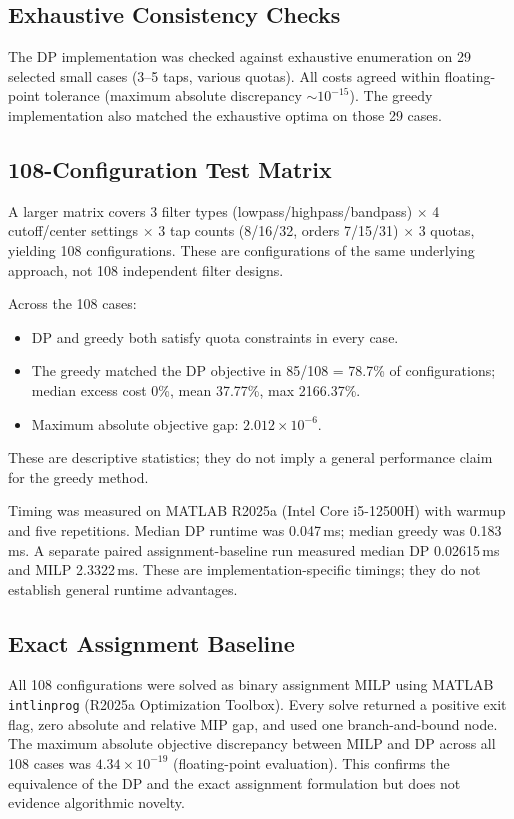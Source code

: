 
\subsection{Exhaustive Consistency Checks}

The DP implementation was checked against exhaustive enumeration on 29
selected small cases (3--5 taps, various quotas). All costs agreed
within floating-point tolerance (maximum absolute discrepancy
$\sim 10^{-15}$). The greedy implementation also matched the
exhaustive optima on those 29 cases.

\subsection{108-Configuration Test Matrix}

A larger matrix covers 3 filter types (lowpass/highpass/bandpass)
$\times$ 4 cutoff/center settings $\times$ 3 tap counts (8/16/32, orders
7/15/31) $\times$ 3 quotas, yielding 108 configurations. These are
configurations of the same underlying approach, not 108 independent
filter designs.

Across the 108 cases:
\begin{itemize}
\item DP and greedy both satisfy quota constraints in every case.
\item The greedy matched the DP objective in 85/108 = 78.7\% of
configurations; median excess cost 0\%, mean 37.77\%, max 2166.37\%.
\item Maximum absolute objective gap: $2.012 \times 10^{-6}$.
\end{itemize}
These are descriptive statistics; they do not imply a general
performance claim for the greedy method.

Timing was measured on MATLAB R2025a (Intel Core i5-12500H) with warmup
and five repetitions. Median DP runtime was 0.047\,ms; median greedy was
0.183\,ms. A separate paired assignment-baseline run measured median DP
0.02615\,ms and MILP 2.3322\,ms. These are implementation-specific
timings; they do not establish general runtime advantages.

\subsection{Exact Assignment Baseline}

All 108 configurations were solved as binary assignment MILP using
MATLAB \texttt{intlinprog} (R2025a Optimization Toolbox). Every solve
returned a positive exit flag, zero absolute and relative MIP gap, and
used one branch-and-bound node. The maximum absolute objective
discrepancy between MILP and DP across all 108 cases was
$4.34 \times 10^{-19}$ (floating-point evaluation). This confirms the
equivalence of the DP and the exact assignment formulation but does not
evidence algorithmic novelty.
